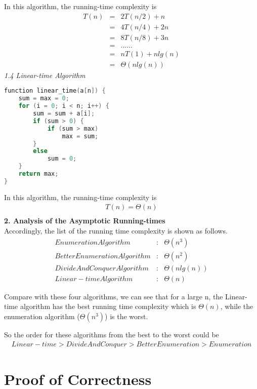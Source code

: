 \documentclass[11pt]{scrreprt}
\begin{document}
In this algorithm, the running-time complexity is
\begin{eqnarray*}
T(n) 	& = & 2T(n/2)+n\\
		& = & 4T(n/4)+2n\\
		& = & 8T(n/8)+3n\\
		& = & ......\\
		& = & nT(1)+nlg(n)\\
		& = & \Theta(nlg(n))
\end{eqnarray*}
\newpage
\textit{1.4 Linear-time Algorithm}\\

\begin{lstlisting}[language=c]
function linear_time(a[n]) {
	sum = max = 0;
	for (i = 0; i < n; i++) {
		sum = sum + a[i];
		if (sum > 0) {
			if (sum > max)
				max = sum;
		}
		else
			sum = 0;
	}
	return max;
}
\end{lstlisting}

In this algorithm, the running-time complexity is
\begin{eqnarray*}
T(n) = \Theta(n)\\
\end{eqnarray*}
\textbf{2. Analysis of the Asymptotic Running-times}\\

Accordingly, the list of the running time complexity is shown as follows.
\begin{eqnarray*}
Enumeration Algorithm&:& \Theta(n^3)\\
Better Enumeration Algorithm&:& \Theta(n^2)\\
Divide And Conquer Algorithm&:& \Theta(nlg(n))\\
Linear-time Algorithm&:& \Theta(n)
\end{eqnarray*}

Compare with these four algorithms, we can see that for a large n, the Linear-time algorithm has the best running time complexity which is $\Theta(n)$, while the enumeration algorithm ($\Theta(n^3)$) is the worst.

So the order for these algorithms from the best to the worst could be 
\begin{eqnarray*}
Linear-time > Divide And Conquer > Better Enumeration > Enumeration
\end{eqnarray*}

\chapter{Proof of Correctness}
\end{document}

